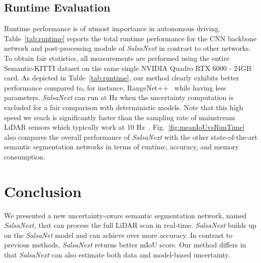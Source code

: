 \documentclass[letterpaper, 10 pt, conference]{ieeeconf}
\newcommand{\snx}[1]{\textit{SalsaNext }{#1}}
\newcommand{\snxk}[1]{\textit{SalsaNext, }{#1}}
\newcommand{\sn}[1]{\textit{SalsaNet }{#1}}
\newcommand{\sk}[1]{Semantic-KITTI {#1}}
\begin{document}
\subsection{Runtime Evaluation} 
Runtime performance is of utmost importance in autonomous driving. 
Table~\ref{tab:runtime} reports the total runtime performance   for the CNN backbone network and post-processing module of  \snx in contrast to other networks. To obtain fair statistics, all measurements are performed using the entire \sk dataset on the same single NVIDIA Quadro RTX 6000 - 24GB card. As depicted in  Table~\ref{tab:runtime}, our method clearly exhibits better performance compared to, for instance, RangeNet++~\cite{rangenetpp} while having  less parameters.
\snx can run at  Hz when the uncertainty computation is excluded for a fair comparison with deterministic models. 
Note that this high speed we reach is significantly faster than the sampling rate  of mainstream LiDAR sensors which typically work at 10 Hz~\cite{KittiDataset}. 
Fig.~\ref{fig:meanIoUvsRunTime} also compares the overall performance of \snx with the other state-of-the-art  semantic segmentation networks  in terms of runtime, accuracy, and  memory consumption. 





    

\section{Conclusion}
 
We presented a new uncertainty-aware semantic segmentation network, named \snxk that can process the full  LiDAR scan in real-time.
\snx builds up on the \sn model and can   achieve over  more accuracy. In contrast to previous methods, \snx returns   better mIoU score.
Our method differs in that \snx can also estimate both data and model-based uncertainty.







 
\end{document}
